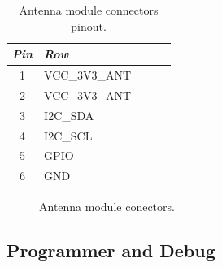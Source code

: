 \begin{table}[!h]
    \centering
    \begin{tabular}{cllll}
        \toprule[1.5pt]
        \textit{Pin} & \textit{Row} \\
        \midrule
        1            & VCC\_3V3\_ANT  \\
        2            & VCC\_3V3\_ANT  \\
        3            & I2C\_SDA       \\
        4            & I2C\_SCL       \\
        5            & GPIO           \\
        6            & GND            \\
        \bottomrule[1.5pt]
    \end{tabular}
    \caption{Antenna module connectors pinout.}
    \label{tab:antenna-connector-pins}
\end{table}

\begin{figure}[!htb]
    \begin{center}
        \qquad
        \caption{Antenna module conectors.}
        \label{fig:ant-connectors}
    \end{center}
\end{figure}

\subsection{Programmer and Debug}

